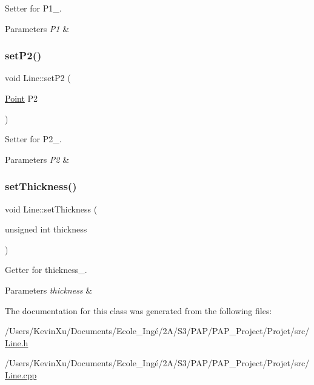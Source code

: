 Setter for P1\+\_\+. 


\begin{DoxyParams}{Parameters}
{\em P1} & \\
\hline
\end{DoxyParams}
\mbox{\label{class_line_a2997dd11403d3f87d812eaa5923125af}} 
\subsubsection{\texorpdfstring{set\+P2()}{setP2()}}
{\footnotesize\ttfamily void Line\+::set\+P2 (\begin{DoxyParamCaption}\item[{\mbox{\hyperlink{class_point}{Point}}}]{P2 }\end{DoxyParamCaption})}



Setter for P2\+\_\+. 


\begin{DoxyParams}{Parameters}
{\em P2} & \\
\hline
\end{DoxyParams}
\mbox{\label{class_line_a5cdf7e1a28d4a4ff1d2411e78ae8909e}} 
\subsubsection{\texorpdfstring{set\+Thickness()}{setThickness()}}
{\footnotesize\ttfamily void Line\+::set\+Thickness (\begin{DoxyParamCaption}\item[{unsigned int}]{thickness }\end{DoxyParamCaption})}



Getter for thickness\+\_\+. 


\begin{DoxyParams}{Parameters}
{\em thickness} & \\
\hline
\end{DoxyParams}


The documentation for this class was generated from the following files\+:\begin{DoxyCompactItemize}
\item 
/\+Users/\+Kevin\+Xu/\+Documents/\+Ecole\+\_\+\+Ingé/2\+A/\+S3/\+P\+A\+P/\+P\+A\+P\+\_\+\+Project/\+Projet/src/\mbox{\hyperlink{_line_8h}{Line.\+h}}\item 
/\+Users/\+Kevin\+Xu/\+Documents/\+Ecole\+\_\+\+Ingé/2\+A/\+S3/\+P\+A\+P/\+P\+A\+P\+\_\+\+Project/\+Projet/src/\mbox{\hyperlink{_line_8cpp}{Line.\+cpp}}\end{DoxyCompactItemize}
